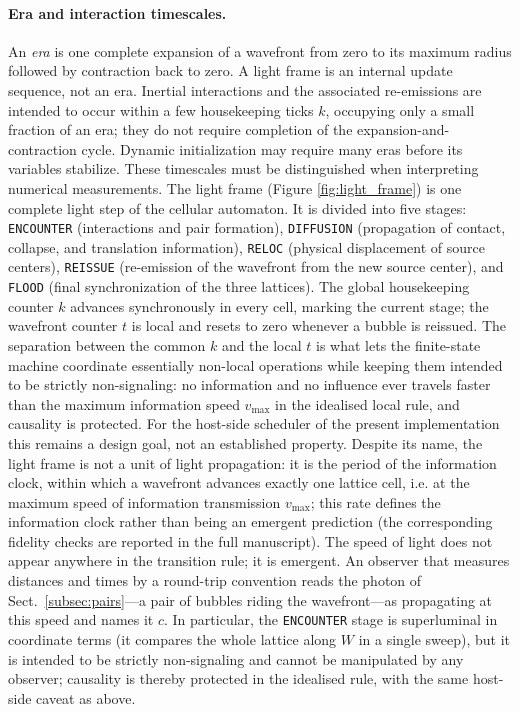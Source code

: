 \documentclass{ijuc}
\begin{document}
\paragraph{Era and interaction timescales.} An \emph{era} is one complete expansion of a wavefront from zero to its maximum radius followed by contraction back to zero. A light frame is an internal update sequence, not an era. Inertial interactions and the associated re-emissions are intended to occur within a few housekeeping ticks $k$, occupying only a small fraction of an era; they do not require completion of the expansion-and-contraction cycle. Dynamic initialization may require many eras before its variables stabilize. These timescales must be distinguished when interpreting numerical measurements.
The light frame (Figure \ref{fig:light_frame}) is one complete light step of the cellular automaton. It is divided into five stages: \texttt{ENCOUNTER} (interactions and pair formation), \texttt{DIFFUSION} (propagation of contact, collapse, and translation information), \texttt{RELOC} (physical displacement of source centers), \texttt{REISSUE} (re-emission of the wavefront from the new source center), and \texttt{FLOOD} (final synchronization of the three lattices). The global housekeeping counter $k$ advances synchronously in every cell, marking the current stage; the wavefront counter $t$ is local and resets to zero whenever a bubble is reissued. The separation between the common $k$ and the local $t$ is what lets the finite-state machine coordinate essentially non-local operations while keeping them intended to be strictly non-signaling: no information and no influence ever travels faster than the maximum information speed $v_{\max}$ in the idealised local rule, and causality is protected.  For the host-side scheduler of the present implementation this remains a design goal, not an established property.
Despite its name, the light frame is not a unit of light propagation: it is the period of the information clock, within which a wavefront advances exactly one lattice cell, i.e. at the maximum speed of information transmission $v_{\max}$; this rate defines the information clock rather than being an emergent prediction (the corresponding fidelity checks are reported in the full manuscript). The speed of light does not appear anywhere in the transition rule; it is emergent. An observer that measures distances and times by a round-trip convention reads the photon of Sect.~\ref{subsec:pairs}---a pair of bubbles riding the wavefront---as propagating at this speed and names it $c$. In particular, the \texttt{ENCOUNTER} stage is superluminal in coordinate terms (it compares the whole lattice along $W$ in a single sweep), but it is intended to be strictly non-signaling and cannot be manipulated by any observer; causality is thereby protected in the idealised rule, with the same host-side caveat as above.
\end{document}
